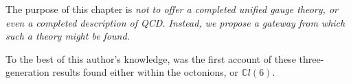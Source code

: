 \documentclass[letterpaper,12pt,titlepage,oneside,final]{book}
\newcommand{\CLsix}{\mathbb{C}l(6)}
\begin{document}


\newpage

The purpose of  this chapter is \it not \rm to offer a completed unified gauge theory, or even a completed description of QCD.  Instead, we propose a gateway from which such a theory might be found.


To the best of this author's knowledge, \cite{Gen} was the first account of these three-generation results found either within the octonions, or $\CLsix$.


\end{document}
